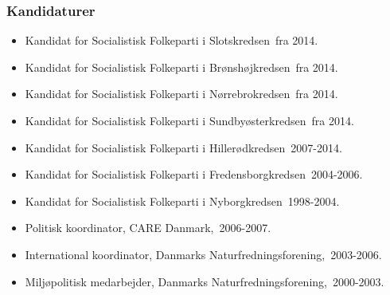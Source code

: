 \documentclass[11pt, a4paper]{awesome-cv}
\begin{document}
\begin{cvletter}
\subsubsection*{Kandidaturer}
\begin{itemize}
\item Kandidat for Socialistisk Folkeparti i Slotskredsen fra 2014.
\item Kandidat for Socialistisk Folkeparti i Brønshøjkredsen fra 2014.
\item Kandidat for Socialistisk Folkeparti i Nørrebrokredsen fra 2014.
\item Kandidat for Socialistisk Folkeparti i Sundbyøsterkredsen fra 2014.
\item Kandidat for Socialistisk Folkeparti i Hillerødkredsen 2007-2014.
\item Kandidat for Socialistisk Folkeparti i Fredensborgkredsen 2004-2006.
\item Kandidat for Socialistisk Folkeparti i Nyborgkredsen 1998-2004.
\end{itemize}
\begin{itemize}
\item Politisk koordinator, CARE Danmark, 2006-2007.
\item International koordinator, Danmarks Naturfredningsforening, 2003-2006.
\item Miljøpolitisk medarbejder, Danmarks Naturfredningsforening, 2000-2003.
\end{itemize}
\end{cvletter}
\end{document}
